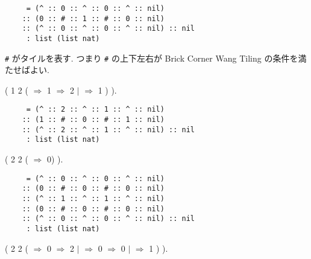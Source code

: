 \documentclass[12pt]{report}
\begin{document}
\begin{verbatim}
     = (^ :: 0 :: ^ :: 0 :: ^ :: nil)
    :: (0 :: # :: 1 :: # :: 0 :: nil)
    :: (^ :: 0 :: ^ :: 0 :: ^ :: nil) :: nil
     : list (list nat)
\end{verbatim}
\verb|#| がタイルを表す. つまり \verb|#| の上下左右が Brick Corner Wang Tiling の条件を満たせばよい.
  \begin{coqdoccode}
\coqdocemptyline
\coqdocnoindent
{} ( 1 2 ( \coqdocvar{\_}  \ensuremath{\Rightarrow}    1 \ensuremath{\Rightarrow} 2 \ensuremath{|} \coqdocvar{\_} \ensuremath{\Rightarrow} 1 )  ).\coqdoceol
\end{coqdoccode}
 
\begin{verbatim}
     = (^ :: 2 :: ^ :: 1 :: ^ :: nil)
    :: (1 :: # :: 0 :: # :: 1 :: nil)
    :: (^ :: 2 :: ^ :: 1 :: ^ :: nil) :: nil
     : list (list nat)
\end{verbatim}
  \begin{coqdoccode}
\coqdocemptyline
\coqdocnoindent
{} ( 2 2 ( \coqdocvar{\_} \coqdocvar{\_} \ensuremath{\Rightarrow} 0)  ).\coqdoceol
\end{coqdoccode}
 
\begin{verbatim}
     = (^ :: 0 :: ^ :: 0 :: ^ :: nil)
    :: (0 :: # :: 0 :: # :: 0 :: nil)
    :: (^ :: 1 :: ^ :: 1 :: ^ :: nil)
    :: (0 :: # :: 0 :: # :: 0 :: nil)
    :: (^ :: 0 :: ^ :: 0 :: ^ :: nil) :: nil
     : list (list nat)
\end{verbatim}
  \begin{coqdoccode}
\coqdocemptyline
\coqdocnoindent
{} ( 2 2 (   \ensuremath{\Rightarrow}    0 \ensuremath{\Rightarrow} 2 \ensuremath{|} \coqdocvar{\_} \ensuremath{\Rightarrow}    0 \ensuremath{\Rightarrow} 0 \ensuremath{|} \coqdocvar{\_} \ensuremath{\Rightarrow} 1  )  ).\coqdoceol
\end{coqdoccode}
 
\end{document}
